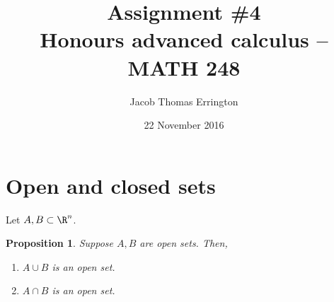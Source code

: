 \documentclass[letterpaper,11pt]{article}
\author{Jacob Thomas Errington}
\title{Assignment \#4\\Honours advanced calculus -- MATH 248}
\date{22 November 2016}
\newtheorem{prop}{Proposition}
\newcommand{\union}{\cup}
\newcommand{\intersn}{\cap}
\begin{document}
\maketitle

\section{Open and closed sets}

Let $A, B \subset \R^n$.

\begin{prop}
  Suppose $A, B$ are open sets. Then,
  \begin{enumerate}
    \item $A \union B$ is an open set.
    \item $A \intersn B$ is an open set.
  \end{enumerate}
\end{prop}
\end{document}
